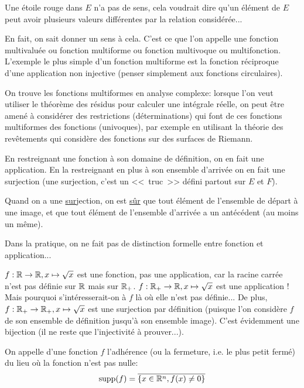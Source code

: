 Une étoile rouge dans $E$ n'a pas de sens, cela voudrait dire qu'un élément de $E$
peut avoir plusieurs valeurs différentes par la relation considérée...

 En fait, on sait donner un sens à cela. C'est ce que l'on appelle une
fonction multivaluée ou fonction multiforme ou fonction multivoque ou multifonction.
L'exemple le plus simple d'un fonction multiforme est la fonction réciproque d'une application
non injective (penser simplement aux fonctions circulaires).

On trouve les fonctions multiformes en analyse complexe: lorsque l'on veut utiliser le théorème des résidus
pour calculer une intégrale réelle, on peut être amené à considérer des restrictions (déterminations)
qui font de ces fonctions multiformes des fonctions (univoques), par exemple en utilisant la théorie des
revêtements qui considère des fonctions sur des surfaces de Riemann.

\medskip
En restreignant une fonction à son domaine de définition, on en fait une application.
En la restreignant en plus à son ensemble d'arrivée on en fait une surjection
(une surjection, c'est  un <<~truc~>> défini partout sur $E$ et $F$).

Quand on a une \underline{sur}jection, on est \underline{sûr} que tout élément
de l'ensemble de départ à une image, et que tout élément de l'ensemble
d'arrivée a un antécédent (au moins un même).

Dans la pratique, on ne fait pas de distinction formelle entre fonction et application...

$f: \mathbb R\to\mathbb R, x\mapsto\sqrt{x}$ est une fonction, pas une application, car la racine carrée
n'est pas définie sur $\mathbb R$ mais sur $\mathbb R_+$. $f: \mathbb R_+\to\mathbb R, x\mapsto\sqrt{x}$
est une application ! Mais pourquoi s'intéresserait-on à $f$ là où elle n'est
pas définie... De plus, $f: \mathbb R_+\to\mathbb R_+, x\mapsto\sqrt{x}$ est une surjection
par définition (puisque l'on considère $f$ de son ensemble de définition jusqu'à
son ensemble image). C'est évidemment une bijection (il ne reste que l'injectivité
à prouver...).

\medskip
\begin{definition}[Support]
On appelle  d'une fonction $f$ l'adhérence (ou la fermeture,
i.e. le plus petit fermé) du lieu où la fonction n'est pas nulle:
\begin{equation}\operatorname{supp}(f)=\overline{\{x\in\mathbb R^n, f(x)\ne0\}}\end{equation}
\end{definition}

